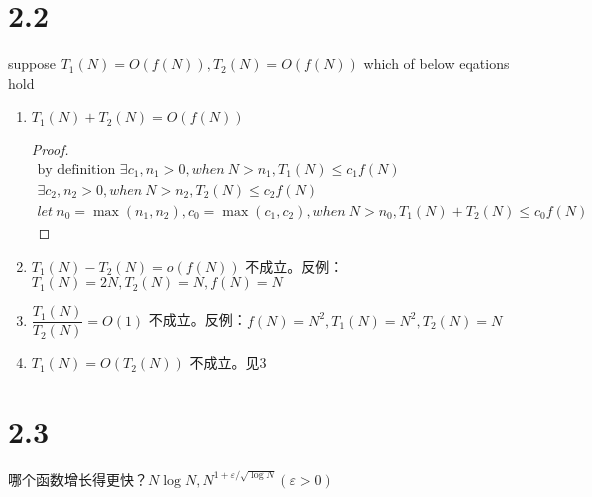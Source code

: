 \documentclass[utf8]{ctexart}
\begin{document}
\section*{2.2} 
suppose $T_1 (N) = O(f(N)) ,T_2 (N) = O(f(N))$ which of below eqations hold
\begin{enumerate}
    \item $T_1(N) + T_2(N) = O(f(N))$
        \begin{proof}
            \begin{gather*}
                \text{by definition } \exists c_1, n_1 > 0,when\ N > n_1, T_1(N) \le c_1f(N)
                \\ \exists c_2, n_2 >0, when\ N > n_2, T_2 (N) \le c_2f(N)\\
                let\ n_0 = \max (n_1, n_2), c_0 = \max (c_1, c_2),when\ N > n_0 , T_1(N) + T_2(N) \le c_0 f(N)
            \end{gather*}
        \end{proof}
    \item $T_1(N) - T_2(N) = o(f(N))$
        不成立。反例：$T_1(N ) = 2N, T_2(N) = N, f(N) = N$
    \item $\dfrac{T_1(N)}{T_2(N)} = O(1)$ 
        不成立。反例：$f(N) = N^2 , T_1 (N) = N^2, T_2(N) = N$
    \item $T_1(N) = O(T_2 (N))$
        不成立。见3
\end{enumerate}

\section*{2.3}
哪个函数增长得更快？$N \log N, N^{1+ \varepsilon / \sqrt{\log N}}(\varepsilon > 0)$
\end{document}
